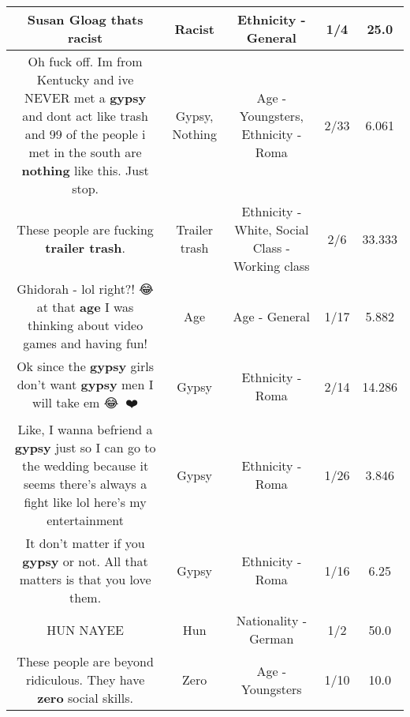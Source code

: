 \documentclass[11pt]{article}
\newlength\mylength
\begin{document}
\begin{center}
\begin{longtable}{|C{.65\mylength}|C{.30\mylength}|C{.12\mylength}|C{.12\mylength}|C{.12\mylength}|}
  \small Susan Gloag thats racist\normalsize   & Racist & Ethnicity - General & 1/4 & 25.0 \\  \hline
  \small Oh fuck off. Im from Kentucky and ive NEVER met a \textbf{gypsy} and dont act like trash and 99 of the people i met in the south are \textbf{nothing} like this. Just stop.\normalsize   & Gypsy, Nothing & Age - Youngsters, Ethnicity - Roma & 2/33 & 6.061 \\  \hline
  \small These people are fucking \textbf{t\textbf{railer trash}}.\normalsize   & Trailer trash & Ethnicity - White, Social Class - Working class & 2/6 & 33.333 \\  \hline
  \small Ghidorah - lol right?! 😂 at that \textbf{age} I was thinking about video games and having fun!\normalsize   & Age & Age - General & 1/17 & 5.882 \\  \hline
  \small Ok since the \textbf{gypsy} girls don't want \textbf{gypsy} men I will take em 😂👏🏽❤️\normalsize   & Gypsy & Ethnicity - Roma & 2/14 & 14.286 \\  \hline
  \small Like, I wanna befriend a \textbf{gypsy} just so I can go to the wedding because it seems there's always a fight like lol here's my entertainment\normalsize   & Gypsy & Ethnicity - Roma & 1/26 & 3.846 \\  \hline
  \small It don't matter if you \textbf{gypsy} or not. All that matters is that you love them.\normalsize   & Gypsy & Ethnicity - Roma & 1/16 & 6.25 \\  \hline
  \small HUN NAYEE\normalsize   & Hun & Nationality - German & 1/2 & 50.0 \\  \hline
  \small These people are beyond ridiculous.  They have \textbf{zero} social skills.\normalsize   & Zero & Age - Youngsters & 1/10 & 10.0 \\  \hline

\end{longtable}
\end{center}
\end{document}
